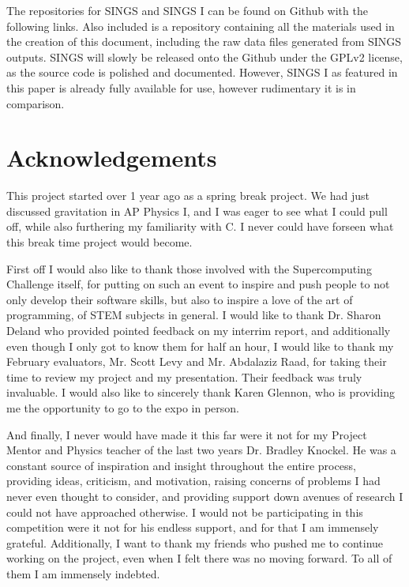 \documentclass[12pt, twoside, letterpaper]{article}
\begin{document}
The repositories for SINGS and SINGS I can be found on Github with the following links. Also included is a repository containing all the materials used in the creation of this document, including the raw data files generated from SINGS outputs. SINGS will slowly be released onto the Github under the GPLv2 license, as the source code is polished and documented. However, SINGS I as featured in this paper is already fully available for use, however rudimentary it is in comparison.
\vspace{0.2cm}

\noindent {}  \href{https://github.com/CodingKraken/SINGS}{} 

\noindent {} \href{https://github.com/CodingKraken/SINGS-I}{}

\noindent {} \href{https://github.com/CodingKraken/SCC-SINGS-Paper}{}

\section*{Acknowledgements} \label{sec:acknowledge}
This project started over 1 year ago as a spring break project. We had just discussed gravitation in AP Physics I, and I was eager to see what I could pull off, while also furthering my familiarity with C. I never could have forseen what this break time project would become.

First off I would also like to thank those involved with the Supercomputing Challenge itself, for putting on such an event to inspire and push people to not only develop their software skills, but also to inspire a love of the art of programming, of STEM subjects in general. I would like to thank Dr. Sharon Deland who provided pointed feedback on my interrim report, and additionally even though I only got to know them for half an hour, I would like to thank my February evaluators, Mr. Scott Levy and Mr. Abdalaziz Raad, for taking their time to review my project and my presentation. Their feedback was truly invaluable. I would also like to sincerely thank Karen Glennon, who is providing me the opportunity to go to the expo in person.

And finally, I never would have made it this far were it not for my Project Mentor and Physics teacher of the last two years Dr. Bradley Knockel. He was a constant source of inspiration and insight throughout the entire process, providing ideas, criticism, and motivation, raising concerns of problems I had never even thought to consider, and providing support down avenues of research I could not have approached otherwise. I would not be participating in this competition were it not for his endless support, and for that I am immensely grateful. Additionally, I want to thank my friends who pushed me to continue working on the project, even when I felt there was no moving forward. To all of them I am immensely indebted.

\printbibliography[heading=bibintoc]
\end{document}
